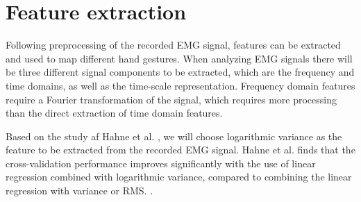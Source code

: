 \section{Feature extraction}


Following preprocessing of the recorded EMG signal, features can be extracted and used to map different hand gestures. When analyzing EMG signals there will be three different signal components to be extracted, which are the frequency and time domains, as well as the time-scale representation. Frequency domain features require a Fourier transformation of the signal, which requires more processing than the direct extraction of time domain features. \cite{phiny2012}


Based on the study af Hahne et al. \cite{hahne2014}, we will choose logarithmic variance as the feature to be extracted from the recorded EMG signal. Hahne et al. finds that the cross-validation performance improves significantly with the use of linear regression combined with logarithmic variance, compared to combining the linear regression with variance or RMS. \cite{hahne2014}. 

